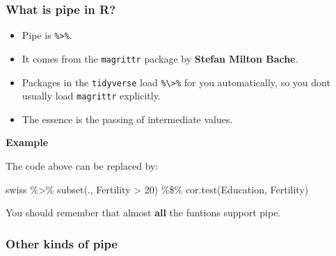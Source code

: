 \documentclass[
]{article}
\newenvironment{Shaded}{}{}
\newcommand{\DecValTok}[1]{\textcolor[rgb]{0.25,0.63,0.44}{#1}}
\newcommand{\FunctionTok}[1]{\textcolor[rgb]{0.02,0.16,0.49}{#1}}
\newcommand{\NormalTok}[1]{#1}
\newcommand{\OtherTok}[1]{\textcolor[rgb]{0.00,0.44,0.13}{#1}}
\newcommand{\SpecialCharTok}[1]{\textcolor[rgb]{0.25,0.44,0.63}{#1}}
\begin{document}
\hypertarget{what-is-pipe-in-r}{%
\subsubsection{What is pipe in R?}\label{what-is-pipe-in-r}}

\begin{itemize}
\item
  Pipe is \texttt{\%\textgreater{}\%}.
\item
  It comes from the \texttt{magrittr} package by \textbf{Stefan Milton
  Bache}.
\item
  Packages in the \texttt{tidyverse} load
  \texttt{\%\textbackslash{}\textgreater{}\%} for you automatically, so
  you don\textquotesingle t usually load \texttt{magrittr} explicitly.
\item
  The essence is the passing of intermediate values.
\end{itemize}

\textbf{Example}

\begin{Shaded}
\end{Shaded}

The code above can be replaced by:

\begin{Shaded}
\begin{Highlighting}[]
\NormalTok{swiss }\SpecialCharTok{\%\textgreater{}\%}
  \FunctionTok{subset}\NormalTok{(., Fertility }\SpecialCharTok{\textgreater{}} \DecValTok{20}\NormalTok{) }\SpecialCharTok{\%\$\%}
  \FunctionTok{cor.test}\NormalTok{(Education, Fertility)}
\end{Highlighting}
\end{Shaded}

You should remember that almost \textbf{all} the funtions support pipe.

\hypertarget{other-kinds-of-pipe}{%
\subsubsection{Other kinds of pipe}\label{other-kinds-of-pipe}}
\end{document}
